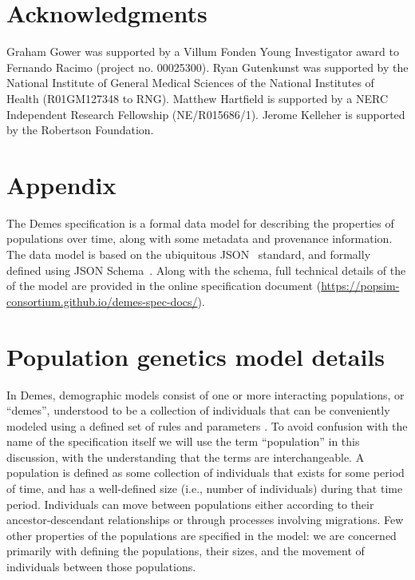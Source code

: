 \documentclass[11pt]{article}
\begin{document}
\section*{Acknowledgments}
Graham Gower was supported by a Villum Fonden Young Investigator award to Fernando Racimo (project no. 00025300).
Ryan Gutenkunst was supported by the National Institute of General Medical Sciences of the National Institutes of Health (R01GM127348 to RNG).
Matthew Hartfield is supported by a NERC Independent Research Fellowship (NE/R015686/1).
Jerome Kelleher is supported by the Robertson Foundation.




\renewcommand{\thefigure}{A\arabic{figure}}
\renewcommand{\thetable}{A\arabic{table}}
\renewcommand{\theequation}{A\arabic{equation}}
\renewcommand{\thesection}{A\arabic{section}}
\setcounter{figure}{0}
\setcounter{table}{0}
\setcounter{equation}{0}

\section*{Appendix}

The Demes specification is a formal data model for describing
the properties of populations over time,
along with some metadata and provenance information.
The data model is based on the ubiquitous JSON~\citep{bray2017javascript}
standard, and formally defined using
JSON Schema~\citep{wright2020json}.
Along with the schema, full technical details of the
of the model are provided in the
online specification document
(\url{https://popsim-consortium.github.io/demes-spec-docs/}).

\section{Population genetics model details}
\label{sec:appendix-pop-gen-model}

In Demes, demographic models consist of one or more interacting populations,
or ``demes'', understood to be a collection of individuals that can be
conveniently modeled using a defined set of rules and parameters
\citep{gilmour_demes_1939,gilmour_deme_1955}.
To avoid confusion with the name of the specification itself we will
use the term ``population'' in this discussion, with the understanding that the
terms are interchangeable.
A population is defined as some collection of individuals that exists for
some period of time, and has a well-defined size (i.e., number of individuals)
during that time period. Individuals can move between populations
either according to their ancestor-descendant relationships
or through processes involving migrations.
Few other properties of the populations are specified in the model:
we are concerned primarily with defining the populations, their sizes, and the
movement of individuals between those populations.
\end{document}

